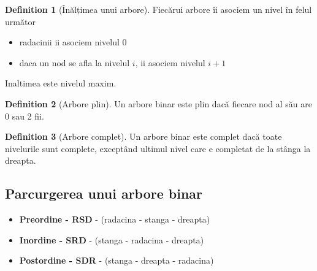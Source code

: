 \documentclass[11pt,a4paper]{article}
\theoremstyle{definition}
\newtheorem{definition}{Definition}[section]
\theoremstyle{plain}
\theoremstyle{remark}
\begin{document}
\begin{definition}[Înălțimea unui arbore]


Fiecărui arbore îi asociem un nivel în felul următor
\begin{itemize}
  \item radacinii ii asociem nivelul 0
  \item daca un nod se afla la nivelul $i$, ii asociem nivelul $i+1$
\end{itemize}

Inaltimea este nivelul maxim.
\end{definition}

\begin{definition}[Arbore plin]
  Un arbore binar este plin dacă fiecare nod al său are 0 sau 2 fii.
\end{definition}


\begin{definition}[Arbore complet]
  Un arbore binar este complet dacă toate nivelurile sunt complete, exceptând ultimul nivel care e completat de la stânga la dreapta.
\end{definition}

\subsection{Parcurgerea unui arbore binar}

\begin{itemize}
  \item \textbf{Preordine - RSD} - (radacina - stanga - dreapta)
  \item \textbf{Inordine - SRD} - (stanga - radacina - dreapta)
  \item \textbf{Postordine - SDR} - (stanga - dreapta - radacina)
\end{itemize}
\end{document}
